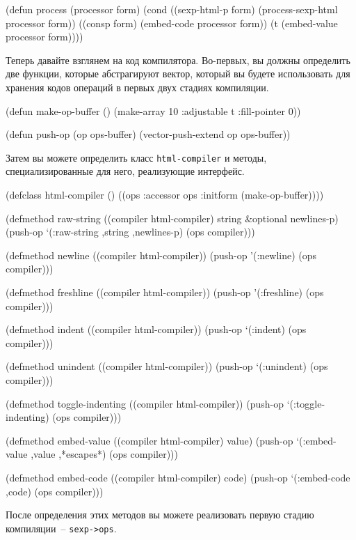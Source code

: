 \begin{myverb}
(defun process (processor form)
  (cond
    ((sexp-html-p form) (process-sexp-html processor form))
    ((consp form)       (embed-code processor form))
    (t                  (embed-value processor form))))
\end{myverb}

Теперь давайте взглянем на код компилятора.  Во-первых, вы должны определить две функции,
которые абстрагируют вектор, который вы будете использовать для хранения кодов операций в
первых двух стадиях компиляции.

\begin{myverb}
(defun make-op-buffer () (make-array 10 :adjustable t :fill-pointer 0))

(defun push-op (op ops-buffer) (vector-push-extend op ops-buffer))
\end{myverb}

Затем вы можете определить класс \lstinline{html-compiler} и методы, специализированные для
него, реализующие интерфейс.

\begin{myverb}
(defclass html-compiler ()
  ((ops :accessor ops :initform (make-op-buffer))))

(defmethod raw-string ((compiler html-compiler) string &optional newlines-p)
  (push-op `(:raw-string ,string ,newlines-p) (ops compiler)))

(defmethod newline ((compiler html-compiler))
  (push-op '(:newline) (ops compiler)))

(defmethod freshline ((compiler html-compiler))
  (push-op '(:freshline) (ops compiler)))

(defmethod indent ((compiler html-compiler))
  (push-op `(:indent) (ops compiler)))

(defmethod unindent ((compiler html-compiler))
  (push-op `(:unindent) (ops compiler)))

(defmethod toggle-indenting ((compiler html-compiler))
  (push-op `(:toggle-indenting) (ops compiler)))

(defmethod embed-value ((compiler html-compiler) value)
  (push-op `(:embed-value ,value ,*escapes*) (ops compiler)))

(defmethod embed-code ((compiler html-compiler) code)
  (push-op `(:embed-code ,code) (ops compiler)))
\end{myverb}

После определения этих методов вы можете реализовать первую стадию компиляции~--
\lstinline{sexp->ops}.

